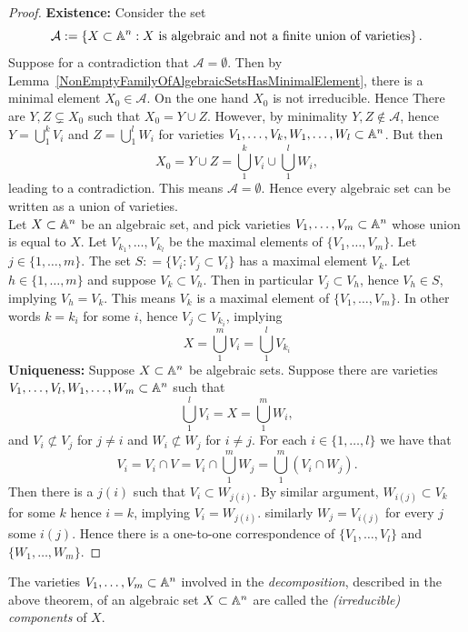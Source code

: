 \begin{proof}
    \textbf{Existence:} Consider the set  
    $$\mathcal{A}:= \left\{ X\subset \mathbb{A}^n : X \text{ is algebraic and not a finite union of varieties} \right\}.$$
    Suppose for a contradiction that $\mathcal{A} = \emptyset$. Then by Lemma~\ref{NonEmptyFamilyOfAlgebraicSetsHasMinimalElement}, there is a minimal element $X_0 \in \mathcal{A}$. On the one hand $X_0$ is not irreducible. Hence There are $Y,Z\subsetneq X_0$ such that $X_0 = Y \cup Z$. However, by minimality $Y,Z\notin \mathcal{A}$, hence $Y= \bigcup_1^k V_i$ and $Z = \bigcup_1^l W_i$ for varieties $V_1,\dots,V_k,W_1,\dots,W_l \subset \mathbb{A}^n$. But then 
    $$X_0 = Y\cup Z = \bigcup_1^k V_i \cup \bigcup_1^l W_i,$$
    leading to a contradiction. This means $\mathcal{A} = \emptyset$. Hence every algebraic set can be written as a union of varieties.\\
    Let $X\subset \mathbb{A}^n$ be an algebraic set, and pick varieties $V_1,\dots,V_m \subset \mathbb{A}^n$ whose union is equal to $X$. Let $V_{k_1},\dots,V_{k_l}$ be the maximal elements of $\{V_1,\dots,V_m\}$. Let $j\in \{1,\dots,m\}$. The set $S: = \{ V_i : V_j\subset V_i\}$ has a maximal element $V_k$. Let $h\in \{1,\dots,m\}$ and suppose $V_k \subset V_h$. Then in particular $V_j \subset V_h$, hence $V_h\in S$, implying $V_h = V_k$. This means $V_k$ is a maximal element of $\{V_1,\dots,V_m\}$. In other words $k=k_i$ for some $i$, hence $V_j \subset V_{k_i}$, implying 
    $$X= \bigcup_1^m V_i = \bigcup_1^l V_{k_i}$$
    \textbf{Uniqueness:}
    Suppose $X\subset \mathbb{A}^n$ be algebraic sets. Suppose there are varieties $V_1,\dots,V_l,W_1,\dots,W_m\subset \mathbb{A}^n$ such that 
    $$\bigcup_1^l V_i = X = \bigcup_1^m W_i,$$
    and $V_i \not\subset V_j$ for $j\neq i$ and $W_i\not\subset W_j$ for $i\neq j$.
    For each $i\in \{1,\dots,l\}$ we have that
    $$V_i = V_i \cap V = V_i \cap \bigcup_1^m W_j = \bigcup_1^m (V_i\cap W_j).$$
    Then there is a $j(i)$ such that $V_i\subset W_{j(i)}$. By similar argument, $W_{i(j)}\subset V_k$ for some $k$ hence $i=k$, implying $V_i = W_{j(i)}$. similarly $W_j = V_{i(j)}$ for every $j$ some $i(j)$. Hence there is a one-to-one correspondence of $\{V_1,\dots,V_l\}$ and $\{W_1,\dots,W_m\}$.
\end{proof}
\begin{definition}
    The varieties $V_1,\dots,V_m\subset \mathbb{A}^n$ involved in the \textit{decomposition}, described in the above theorem, of an algebraic set $X\subset \mathbb{A}^n$ are called the \textit{(irreducible) components} of $X$.     
\end{definition}
